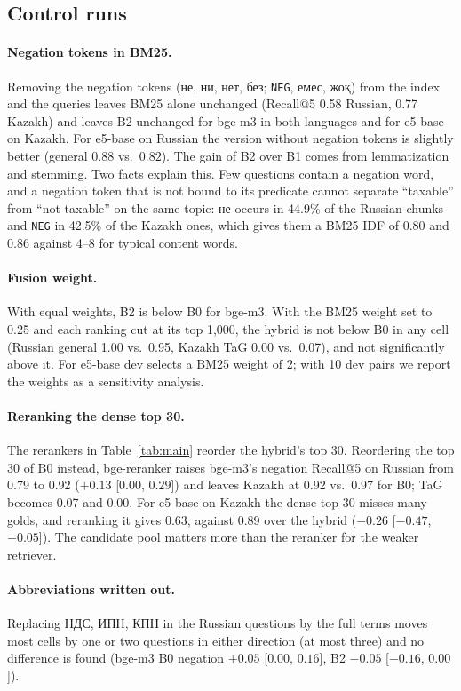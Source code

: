 \documentclass[11pt]{article}
\newcommand{\ru}[1]{#1}
\begin{document}
\subsection{Control runs}\label{sec:controls}
\paragraph{Negation tokens in BM25.} Removing the negation tokens (\ru{не, ни, нет, без}; \texttt{NEG},
\ru{емес}, \ru{жоқ}) from the index and the queries leaves BM25 alone unchanged (Recall@5 0.58 Russian, 0.77
Kazakh) and leaves B2 unchanged for bge-m3 in both languages and for e5-base on Kazakh. For e5-base on Russian
the version without negation tokens is slightly better (general $0.88$ vs.\ $0.82$). The gain of B2 over B1
comes from lemmatization and stemming. Two facts explain this. Few questions contain a negation word, and a
negation token that is not bound to its predicate cannot separate ``taxable'' from ``not taxable'' on the
same topic: \ru{не} occurs in 44.9\% of the Russian chunks and \texttt{NEG} in 42.5\% of the Kazakh ones, which
gives them a BM25 IDF of 0.80 and 0.86 against 4--8 for typical content words.

\paragraph{Fusion weight.} With equal weights, B2 is below B0 for bge-m3. With the BM25 weight set to 0.25 and
each ranking cut at its top 1,000, the hybrid is not below B0 in any cell (Russian general 1.00 vs.\ 0.95,
Kazakh TaG 0.00 vs.\ 0.07), and not significantly above it. For e5-base dev selects a BM25 weight of 2; with 10
dev pairs we report the weights as a sensitivity analysis.

\paragraph{Reranking the dense top 30.} The rerankers in Table~\ref{tab:main} reorder the hybrid's top 30.
Reordering the top 30 of B0 instead, bge-reranker raises bge-m3's negation Recall@5 on Russian from 0.79 to
0.92 ($+0.13$ [$0.00$, $0.29$]) and leaves Kazakh at 0.92 vs.\ 0.97 for B0; TaG becomes 0.07 and 0.00. For
e5-base on Kazakh the dense top 30 misses many golds, and reranking it gives 0.63, against 0.89 over the hybrid
($-0.26$ [$-0.47$, $-0.05$]). The candidate pool matters more than the reranker for the weaker retriever.

\paragraph{Abbreviations written out.} Replacing \ru{НДС, ИПН, КПН} in the Russian questions by the full
terms moves most cells by one or two questions in either direction (at most three) and no difference is found (bge-m3 B0 negation
$+0.05$ [$0.00$, $0.16$], B2 $-0.05$ [$-0.16$, $0.00$]).
\end{document}
